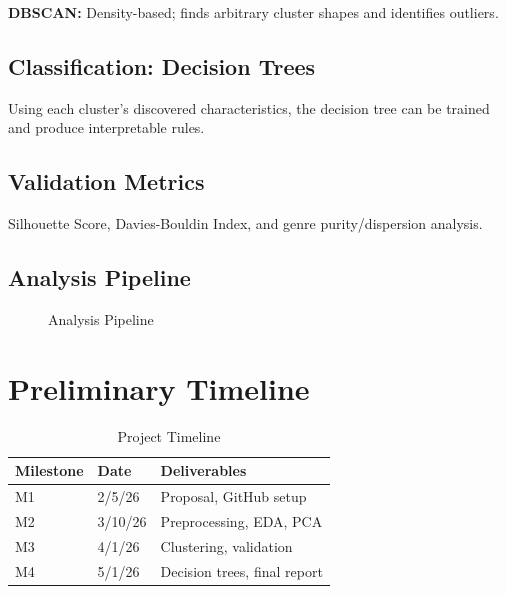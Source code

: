 \documentclass[10pt,twocolumn]{article}
\begin{document}
\textbf{DBSCAN:} Density-based; finds arbitrary cluster shapes and identifies outliers.

\subsection{Classification: Decision Trees}
Using each cluster's discovered characteristics, the decision tree can be trained and produce interpretable rules.

\subsection{Validation Metrics}
Silhouette Score, Davies-Bouldin Index, and genre purity/dispersion analysis.

\subsection{Analysis Pipeline}

\begin{figure}[htbp]
\centering
{}
\caption{Analysis Pipeline}
\label{fig:pipeline}
\end{figure}

\section{Preliminary Timeline}

\begin{table}[htbp]
\caption{Project Timeline}
\label{tab:timeline}
\centering
\footnotesize
\begin{tabular}{@{}llp{3.5cm}@{}}
\toprule
\textbf{Milestone} & \textbf{Date} & \textbf{Deliverables} \\
\midrule
M1 & 2/5/26 & Proposal, GitHub setup \\
M2 & 3/10/26 & Preprocessing, EDA, PCA \\
M3 & 4/1/26 & Clustering, validation \\
M4 & 5/1/26 & Decision trees, final report \\
\bottomrule
\end{tabular}
\end{table}
\end{document}
